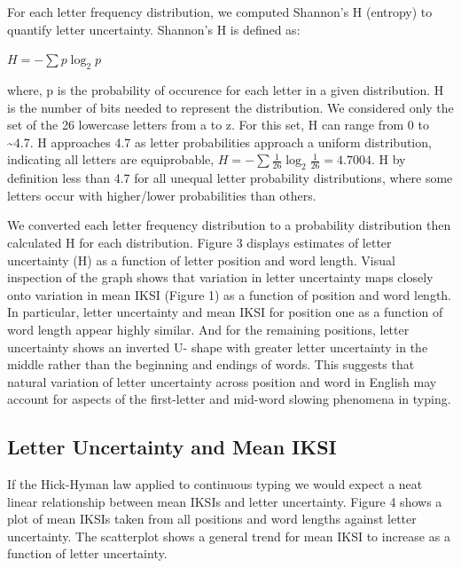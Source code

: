 \documentclass[floatsintext,man]{apa6}
\theoremstyle{definition}
\theoremstyle{definition}
\theoremstyle{definition}
\theoremstyle{remark}
\begin{document}
For each letter frequency distribution, we computed Shannon's H
(entropy) to quantify letter uncertainty. Shannon's H is defined as:

\(H = -\sum p \log_2 p\)

where, p is the probability of occurence for each letter in a given
distribution. H is the number of bits needed to represent the
distribution. We considered only the set of the 26 lowercase letters
from a to z. For this set, H can range from 0 to \textasciitilde{}4.7. H
approaches 4.7 as letter probabilities approach a uniform distribution,
indicating all letters are equiprobable,
\(H = -\sum \frac{1}{26} \log_2 \frac{1}{26} = 4.7004\). H by definition
less than 4.7 for all unequal letter probability distributions, where
some letters occur with higher/lower probabilities than others.

We converted each letter frequency distribution to a probability
distribution then calculated H for each distribution. Figure 3 displays
estimates of letter uncertainty (H) as a function of letter position and
word length. Visual inspection of the graph shows that variation in
letter uncertainty maps closely onto variation in mean IKSI (Figure 1)
as a function of position and word length. In particular, letter
uncertainty and mean IKSI for position one as a function of word length
appear highly similar. And for the remaining positions, letter
uncertainty shows an inverted U- shape with greater letter uncertainty
in the middle rather than the beginning and endings of words. This
suggests that natural variation of letter uncertainty across position
and word in English may account for aspects of the first-letter and
mid-word slowing phenomena in typing.

\subsection{Letter Uncertainty and Mean
IKSI}\label{letter-uncertainty-and-mean-iksi}

If the Hick-Hyman law applied to continuous typing we would expect a
neat linear relationship between mean IKSIs and letter uncertainty.
Figure 4 shows a plot of mean IKSIs taken from all positions and word
lengths against letter uncertainty. The scatterplot shows a general
trend for mean IKSI to increase as a function of letter uncertainty.
\end{document}
